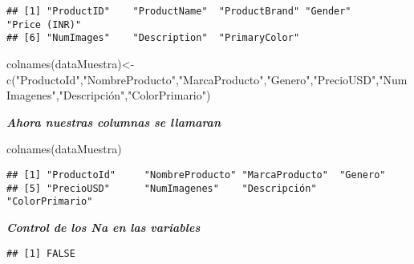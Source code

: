 \documentclass[
]{article}
\newenvironment{Shaded}{\begin{snugshade}}{\end{snugshade}}
\newcommand{\FunctionTok}[1]{\textcolor[rgb]{0.00,0.00,0.00}{#1}}
\newcommand{\NormalTok}[1]{#1}
\newcommand{\OtherTok}[1]{\textcolor[rgb]{0.56,0.35,0.01}{#1}}
\newcommand{\SpecialCharTok}[1]{\textcolor[rgb]{0.00,0.00,0.00}{#1}}
\newcommand{\StringTok}[1]{\textcolor[rgb]{0.31,0.60,0.02}{#1}}
\begin{document}
\begin{verbatim}
## [1] "ProductID"    "ProductName"  "ProductBrand" "Gender"       "Price (INR)" 
## [6] "NumImages"    "Description"  "PrimaryColor"
\end{verbatim}

\begin{Shaded}
\begin{Highlighting}[]
\FunctionTok{colnames}\NormalTok{(dataMuestra)}\OtherTok{\textless{}{-}}\FunctionTok{c}\NormalTok{(}\StringTok{"ProductoId"}\NormalTok{,}\StringTok{"NombreProducto"}\NormalTok{,}\StringTok{"MarcaProducto"}\NormalTok{,}\StringTok{"Genero"}\NormalTok{,}\StringTok{"PrecioUSD"}\NormalTok{,}\StringTok{"NumImagenes"}\NormalTok{,}\StringTok{"Descripción"}\NormalTok{,}\StringTok{"ColorPrimario"}\NormalTok{)}
\end{Highlighting}
\end{Shaded}

\textbf{\emph{Ahora nuestras columnas se llamaran}}

\begin{Shaded}
\begin{Highlighting}[]
\FunctionTok{colnames}\NormalTok{(dataMuestra)}
\end{Highlighting}
\end{Shaded}

\begin{verbatim}
## [1] "ProductoId"     "NombreProducto" "MarcaProducto"  "Genero"        
## [5] "PrecioUSD"      "NumImagenes"    "Descripción"    "ColorPrimario"
\end{verbatim}

\textbf{\emph{Control de los Na en las variables}}

\begin{Shaded}
\end{Shaded}

\begin{verbatim}
## [1] FALSE
\end{verbatim}

\begin{Shaded}
\end{Shaded}
\end{document}
